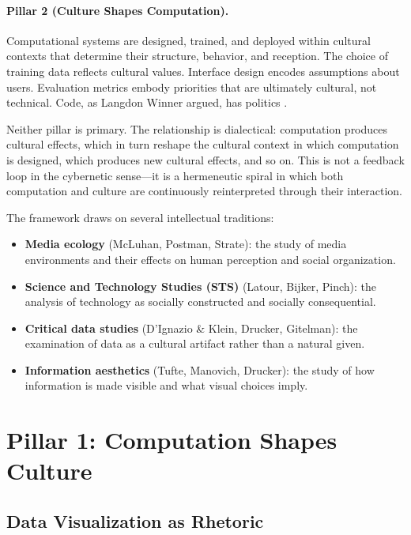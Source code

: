\documentclass[11pt,a4paper]{article}
\begin{document}
\paragraph{Pillar 2 (Culture Shapes Computation).}
Computational systems are designed, trained, and deployed within cultural contexts that determine their structure, behavior, and reception. The choice of training data reflects cultural values. Interface design encodes assumptions about users. Evaluation metrics embody priorities that are ultimately cultural, not technical. Code, as Langdon Winner argued, has politics \citep{winner1980}.

Neither pillar is primary. The relationship is dialectical: computation produces cultural effects, which in turn reshape the cultural context in which computation is designed, which produces new cultural effects, and so on. This is not a feedback loop in the cybernetic sense---it is a hermeneutic spiral in which both computation and culture are continuously reinterpreted through their interaction.

The framework draws on several intellectual traditions:

\begin{itemize}[leftmargin=*, itemsep=2pt]
  \item \textbf{Media ecology} (McLuhan, Postman, Strate): the study of media environments and their effects on human perception and social organization.
  \item \textbf{Science and Technology Studies (STS)} (Latour, Bijker, Pinch): the analysis of technology as socially constructed and socially consequential.
  \item \textbf{Critical data studies} (D'Ignazio \& Klein, Drucker, Gitelman): the examination of data as a cultural artifact rather than a natural given.
  \item \textbf{Information aesthetics} (Tufte, Manovich, Drucker): the study of how information is made visible and what visual choices imply.
\end{itemize}

\section{Pillar 1: Computation Shapes Culture}

\subsection{Data Visualization as Rhetoric}
\end{document}
